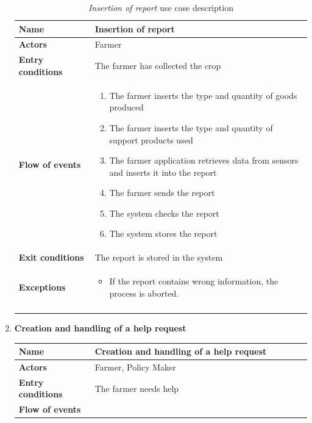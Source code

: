 \documentclass[10pt]{article}
\begin{document}
\begin{enumerate}
\begin{longtable}{p{0.26\linewidth}p{0.75\linewidth}}
            \textbf{Name} & \textbf{Insertion of report} \\
            \midrule
            \textbf{Actors} & Farmer\\
            \midrule
            \textbf{Entry conditions} & The farmer has collected the crop \\
            \midrule
            \textbf{Flow of events} & 
            \begin{enumerate}
                \item The farmer inserts the type and quantity of goods produced
                \item The farmer inserts the type and quantity of support products used
                \item The farmer application retrieves data from sensors and inserts it into the report
                \item The farmer sends the report
                \item The system checks the report
                \item The system stores the report
            \end{enumerate} \\
            \midrule
            \textbf{Exit conditions} & The report is stored in the system\\
            \midrule
            \textbf{Exceptions} & 
            \begin{itemize}
                \item If the report contains wrong information, the process is aborted.
            \end{itemize} \\
            \bottomrule
            \caption{\emph{Insertion of report} use case description}
        \end{longtable}
    \newpage
    \item \textbf{Creation and handling of a help request}
        \begin{longtable}{p{0.26\linewidth}p{0.75\linewidth}}
            \toprule
            \textbf{Name} & \textbf{Creation and handling of a help request} \\
            \midrule
            \textbf{Actors} & Farmer, Policy Maker\\
            \midrule
            \textbf{Entry conditions} & The farmer needs help \\
            \midrule
            \textbf{Flow of events} & 
            \begin{enumerate}

\end{enumerate}
\end{longtable}
\end{enumerate}
\end{document}
